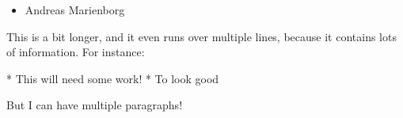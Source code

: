 \documentclass[30pt, Screen4to3]{foils}
\begin{document}
\begin{itemize}
\item Andreas Marienborg
\end{itemize}

This is a bit longer, and
it even runs over multiple lines, because it contains lots of information. For instance:

* This will need some work!
* To look good

But I can have multiple paragraphs!

\end{document}
